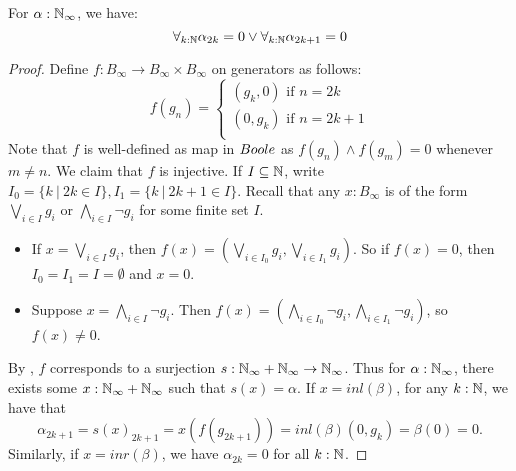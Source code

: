 \begin{theorem}\label{LLPO}
  For $\alpha:\mathbb{N}_\infty$, 
  we have: 
  \begin{equation}\label{eqnLLPO}
    \forall_{k:\mathbb{N}} \alpha_{2k} = 0  \vee \forall_{k:\mathbb{N}} \alpha_{2k+1} = 0
  \end{equation}
\end{theorem}
\begin{proof}
%
  Define $f:B_\infty \to B_\infty \times B_\infty$ on generators as follows:
  \begin{equation}\label{eqnLLPOProofMap}
    f(g_n) =\begin{cases}
      (g_k,0) \text{ if } n = 2k\\
      (0,g_k) \text{ if } n = 2k+1\\
    \end{cases}
  \end{equation}
  Note that $f$ is well-defined as map in $\Boole$ as 
  $f(g_n) \wedge f(g_m) = 0$ whenever $m\neq n$. 
  We claim that $f$ is injective. 
  If $I\subseteq \mathbb{N}$, write 
  $ I_0 =\{k\ |\ 2k \in I\}, 
    I_1 =\{k\ |\ 2k+1 \in I\}
  $.
  Recall that any $x:B_\infty$ is of the form 
  $\bigvee_{i\in I} g_i$ or $\bigwedge_{i\in I} \neg g_i$ for some finite set $I$. 
  \begin{itemize}
    \item If $x = \bigvee_{i\in I} g_i$, then 
      $f(x) = (\bigvee_{i\in I_0}g_{i}, \bigvee_{i\in I_1}g_i)$. 
      So if $f(x) = 0$, then $I_0=I_1 = I = \emptyset$ and $x = 0$. 
    \item Suppose 
      $x = \bigwedge_{i\in I} \neg g_i$.
      Then $f(x) = (\bigwedge_{i\in I_0} \neg g_i, \bigwedge_{i\in I_1} \neg g_i)$, 
      so $f(x) \neq 0$. 
  \end{itemize}
  By ,
  $f$ corresponds to a surjection 
  $s:\mathbb{N}_{\infty} + \mathbb{N}_{\infty} \to \mathbb{N}_{\infty}$.
  Thus for $\alpha : \mathbb{N}_{\infty}$, 
  there exists some $x:\mathbb{N}_{\infty} + \mathbb{N}_{\infty}$ such that $s(x) = \alpha$. 
  If $x = inl(\beta)$, 
  for any $k:\mathbb{N}$, we have that 
  $$\alpha_{2k+1} = s(x)_{2k+1} = x(f(g_{2k+1})) = inl(\beta) (0,g_k)  = \beta(0) = 0.$$
  Similarly, if $x = inr(\beta)$, we have $\alpha_{2k} = 0$ for all $k:\mathbb{N}$. 
\end{proof}
